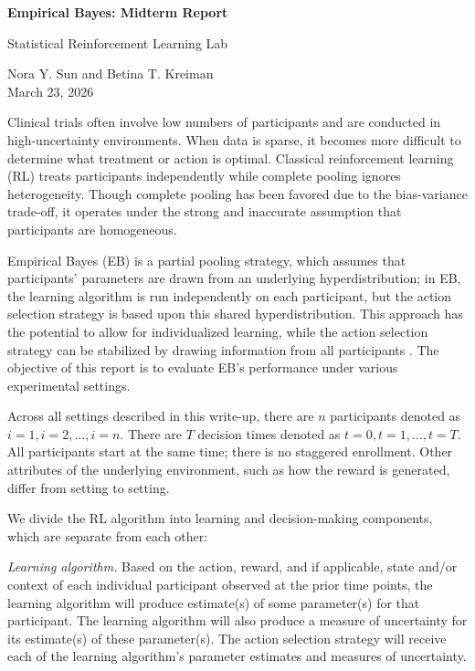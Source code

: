 \documentclass[letterpaper, 9pt]{extarticle}
\newcounter{mysection}
\newcounter{mysubsection}[mysection]
\newcounter{mysubsubsection}[mysubsection]
\renewcommand{\themysection}{\arabic{mysection}}
\newcommand{\sectiontitle}[1]{%
  \refstepcounter{mysection}%
  \setcounter{mysubsection}{0}%
  \setcounter{mysubsubsection}{0}%
  \vspace{0.6em}%
  \noindent{\textsf{\large \textbf{\themysection\hspace{0.8em}#1}}}\par\vspace{0.4em}%
}
\begin{document}
\pagestyle{fancy}
\fancyhf{}
\fancyfoot[C]{\thepage}

\begin{center}
{\huge \textsf{\textbf{Empirical Bayes: Midterm Report}} \par
Statistical Reinforcement Learning Lab}

\vspace{1em}   %

Nora Y. Sun and Betina T. Kreiman\\
\vspace{0.05cm}
March 23, 2026
\end{center}

\sectiontitle{Introduction}
Clinical trials often involve low numbers of participants and are conducted in high-uncertainty environments. When data is sparse, it becomes more difficult to determine what treatment or action is optimal. Classical reinforcement learning (RL) treats participants independently while complete pooling ignores heterogeneity. Though complete pooling has been favored due to the bias-variance trade-off, it operates under the strong and inaccurate assumption that participants are homogeneous.

Empirical Bayes (EB) is a partial pooling strategy, which assumes that participants' parameters are drawn from an underlying hyperdistribution; in EB, the learning algorithm is run independently on each participant, but the action selection strategy is based upon this shared hyperdistribution. This approach has the potential to allow for individualized learning, while the action selection strategy can be stabilized by drawing information from all participants \autocite{doi:10.3102/10769986010002075}. The objective of this report is to evaluate EB's performance under various experimental settings.

Across all settings described in this write-up, there are $n$ participants denoted as $i = 1, i=2, \ldots, i=n$. There are $T$ decision times denoted as $t=0, t=1, \ldots, t=T$. All participants start at the same time; there is no staggered enrollment. Other attributes of the underlying environment, such as how the reward is generated, differ from setting to setting. 

We divide the RL algorithm into learning and decision-making components, which are separate from each other:

\textit{Learning algorithm.} Based on the action, reward, and if applicable, state and/or context of each individual participant observed at the prior time points, the learning algorithm will produce estimate(s) of some parameter(s) for that participant. The learning algorithm will also produce a measure of uncertainty for its estimate(s) of these parameter(s). The action selection strategy will receive each of the learning algorithm's parameter estimates and measures of uncertainty. 
\end{document}
